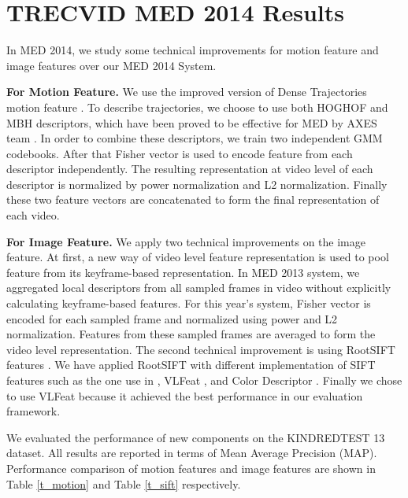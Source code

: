 
\chapter{TRECVID MED 2014 Results}

\ifpdf
\graphicspath{{Appendix2/Figs/Raster/}{Appendix2/Figs/PDF/}{Appendix2/Figs/}}
\else
\graphicspath{{Appendix2/Figs/Vector/}{Appendix2/Figs/}}
\fi

In MED 2014, we study some technical improvements for motion feature and image features over our MED 2014 System.

\textbf{For Motion Feature.} We use the improved version of Dense Trajectories motion feature \cite{wang2013action}. To describe trajectories, we choose to use both HOGHOF and MBH descriptors, which have been proved to be effective for MED by AXES team \cite{aly2013axes}. In order to combine these descriptors, we train two independent GMM codebooks. After that Fisher vector is used to encode feature from each descriptor independently. The resulting representation at video level of each descriptor is normalized by power normalization and L2 normalization. Finally these two feature vectors are concatenated to form the final representation of each video.

\textbf{For Image Feature.} We apply two technical improvements on the image feature. At first, a new way of video level feature representation is used to pool feature from its keyframe-based representation. In MED 2013 system, we aggregated local descriptors from all sampled frames in video without explicitly calculating keyframe-based features. For this year's system, Fisher vector is encoded for each sampled frame and normalized using power and L2 normalization. Features from these sampled frames are averaged to form the video level representation. The second technical improvement is using RootSIFT features \cite{arandjelovic2012three}. We have applied RootSIFT with different implementation of SIFT features such as the one use in \cite{mikolajczyk2005performance}, VLFeat \cite{vedaldi08vlfeat}, and Color Descriptor \cite{vandeSandeTPAMI2010}. Finally we chose to use VLFeat because it achieved the best performance in our evaluation framework.

We evaluated the performance of new components on the KINDREDTEST 13 dataset. All results are reported in terms of Mean Average Precision (MAP). Performance comparison of motion features and image features are shown in Table \ref{t_motion} and Table \ref{t_sift} respectively. 

